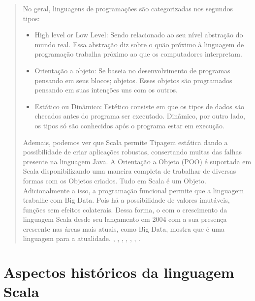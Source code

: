 \begin{quote}


   No geral, linguagens de programações são categorizadas nos segundos tipos:
   \begin{itemize}
      \item  High level or Low Level:  Sendo relacionado ao seu nível abstração do mundo real. Essa abstração diz sobre o quão próximo à linguagem de programação trabalha próximo ao que os computadores interpretam.
      \item  Orientação a objeto:  Se baseia no desenvolvimento de programas pensando em seus blocos; objetos. Esses objetos são programados pensando em suas intenções uns com os outros.
      \item  Estático ou Dinâmico: Estético consiste em que os tipos de dados são checados antes do programa ser executado. Dinâmico, por outro lado, os tipos só são conhecidos após o programa estar em execução.
   \end{itemize}


   Ademais, podemos ver que Scala permite Tipagem estática dando a possibilidade de criar aplicações robustas, consertando muitas das falhas presente na linguagem Java. A Orientação a Objeto (POO) é suportada em Scala disponibilizando uma maneira completa de trabalhar de diversas formas com os Objetos criados. Tudo em Scala é um Objeto. Adicionalmente a isso, a programação funcional permite que a linguagem trabalhe com Big Data. Pois há a possibilidade de valores imutáveis, funções sem efeitos colaterais.
   Dessa forma, o com o crescimento da linguagem Scala desde seu lançamento em 2004 com a sua presença crescente nas áreas mais atuais, como Big Data, mostra que é uma linguagem para a atualidade.
   \cite{Elahi}, \cite{Nilanjan}, \cite{Wampler2021}, \cite{Data1},
   \cite{Data2}, \cite{web}, \cite{Whaling}.

\end{quote}


\section{Aspectos hist\'{o}ricos da linguagem Scala}

